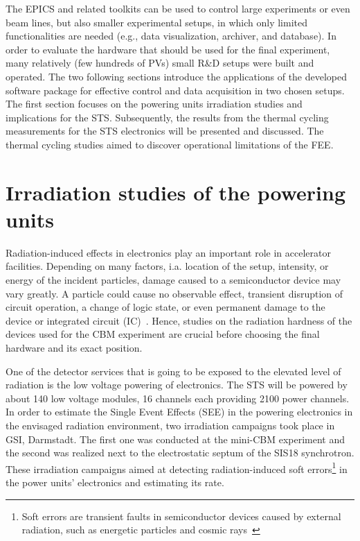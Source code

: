 The \gls{EPICS} and related toolkits can be used to control large experiments or even beam lines, but also smaller experimental setups, in which only limited functionalities are needed (e.g., data visualization, archiver, and database). In order to evaluate the hardware that should be used for the final experiment, many relatively (few hundreds of \glspl{PV}) small R\&D setups were built and operated. %
The two following sections introduce the applications of the developed software package for effective control and data acquisition in two chosen setups. The first section focuses on the powering units irradiation studies and implications for the \gls{STS}. Subsequently, the results from the thermal cycling measurements for the \gls{STS} electronics will be presented and discussed. The thermal cycling studies aimed to discover operational limitations of the \gls{FEE}. 


\section{Irradiation studies of the powering units}

Radiation-induced effects in electronics play an important role in accelerator facilities. Depending on many factors, i.a. location of the setup, intensity, or energy of the incident particles, damage caused to a semiconductor device may vary greatly. A particle could cause no observable effect, transient disruption of circuit operation, a change of logic state, or even permanent damage to the device or integrated circuit (IC)~\cite{dodd}. Hence, studies on the radiation hardness of the devices used for the \gls{CBM} experiment are crucial before choosing the final hardware and its exact position.

One of the detector services that is going to be exposed to the elevated level of radiation is the low voltage powering of electronics. The \gls{STS} will be powered by about 140 low voltage modules, 16 
channels each providing 2100 power channels. In order to estimate the Single Event Effects (\gls{SEE}) in the powering electronics in the envisaged radiation environment, two irradiation campaigns took place in \gls{GSI}, Darmstadt.  The first one was conducted at the mini-CBM experiment and the second was realized next to the electrostatic septum of the SIS18 synchrotron. These irradiation campaigns aimed at detecting radiation-induced soft errors\footnote{Soft errors are transient faults in semiconductor devices caused by external radiation, such as energetic particles and cosmic rays~\cite{6338321}} in the power units' electronics and estimating its rate.

